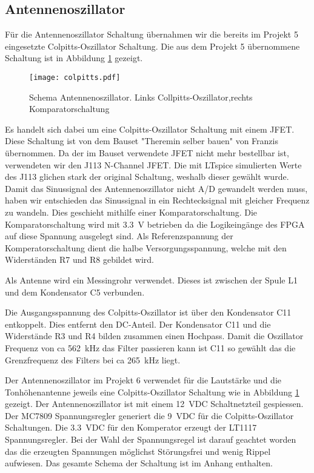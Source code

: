 \subsection{Antennenoszillator}\label{subsec:Antennenoszilator}
Für die Antennenoszillator Schaltung übernahmen wir die bereits im Projekt 5 eingesetzte Colpitts-Oszillator Schaltung. Die aus dem Projekt 5 übernommene Schaltung ist in Abbildung \ref{img:colpitts} gezeigt.

\begin{figure}[h]
	\centering
	\texttt{[image: colpitts.pdf]}
	\caption{Schema Antennenoszillator. Links Collpitts-Oszillator,rechts Komparatorschaltung}
	\label{img:colpitts}
\end{figure} 

Es handelt sich dabei um eine Colpitts-Oszillator Schaltung mit einem JFET. Diese Schaltung ist von dem Bauset "Theremin selber bauen" von Franzis übernommen. 
Da der im Bauset verwendete JFET nicht mehr bestellbar ist, verwendeten wir den J113 N-Channel JFET. Die mit LTspice simulierten Werte des J113 glichen stark der original Schaltung, weshalb dieser gewählt wurde. 
Damit das Sinussignal des Antennenoszillator nicht A/D gewandelt werden muss, haben wir entschieden das Sinussignal in ein Rechtecksignal mit gleicher Frequenz zu wandeln. Dies geschieht mithilfe einer Komparatorschaltung. 
Die Komparatorschaltung wird mit \SI{3.3}{V} betrieben da die Logikeingänge des FPGA auf diese Spannung ausgelegt sind. Als Referenzspannung der Komperatorschaltung dient die halbe Versorgungsspannung, welche mit den Widerständen R7 und R8 gebildet wird. 

Als Antenne wird ein Messingrohr verwendet. Dieses ist zwischen der Spule L1 und dem Kondensator C5 verbunden. 

Die Ausgangsspannung des Colpitts-Oszillator ist über den Kondensator C11 entkoppelt. Dies entfernt den DC-Anteil. Der Kondensator C11 und die Widerstände R3 und R4 bilden zusammen einen Hochpass. Damit die Oszillator Frequenz von ca \SI{562}{kHz} das Filter passieren kann ist C11 so gewählt das die Grenzfrequenz des Filters bei ca \SI{265}{kHz} liegt. 

Der Antennenoszillator im Projekt 6 verwendet für die Lautstärke und die Tonhöhenantenne jeweils eine Colpitts-Oszillator Schaltung wie in Abbildung \ref{img:colpitts} gezeigt. Der Antennenoszillator ist mit einem \SI{12} {VDC} Schaltnetzteil gespiessen. Der MC7809 Spannungsregler generiert die \SI{9} {VDC} für die Colpitts-Oszillator Schaltungen. Die \SI{3.3} {VDC} für den Komperator erzeugt der LT1117 Spannungsregler. Bei der Wahl der Spannungsregel ist darauf geachtet worden das die erzeugten Spannungen möglichst Störungsfrei und wenig Rippel aufwiesen. Das gesamte Schema der Schaltung ist im Anhang enthalten.


